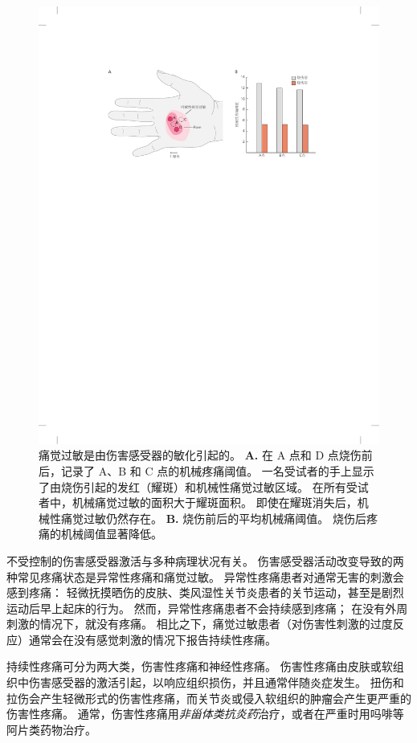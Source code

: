\begin{figure}[htbp]
	\centering
	\includegraphics[width=0.95\linewidth]{chap20/fig_20_7}
	\caption{痛觉过敏是由伤害感受器的敏化引起的\cite{raja1984evidence}。
		\textbf{A.} 在 A 点和 D 点烧伤前后，记录了 A、B 和 C 点的机械疼痛阈值。
		一名受试者的手上显示了由烧伤引起的发红（耀斑）和机械性痛觉过敏区域。
		在所有受试者中，机械痛觉过敏的面积大于耀斑面积。
		即使在耀斑消失后，机械性痛觉过敏仍然存在。
		\textbf{B.} 烧伤前后的平均机械痛阈值。
		烧伤后疼痛的机械阈值显著降低。}
	\label{fig:20_7}
\end{figure}


不受控制的伤害感受器激活与多种病理状况有关。
伤害感受器活动改变导致的两种常见疼痛状态是异常性疼痛和痛觉过敏。
异常性疼痛患者对通常无害的刺激会感到疼痛：
轻微抚摸晒伤的皮肤、类风湿性关节炎患者的关节运动，甚至是剧烈运动后早上起床的行为。
然而，异常性疼痛患者不会持续感到疼痛；
在没有外周刺激的情况下，就没有疼痛。
相比之下，痛觉过敏患者（对伤害性刺激的过度反应）通常会在没有感觉刺激的情况下报告持续性疼痛。


持续性疼痛可分为两大类，伤害性疼痛和神经性疼痛。
伤害性疼痛由皮肤或软组织中伤害感受器的激活引起，以响应组织损伤，并且通常伴随炎症发生。
扭伤和拉伤会产生轻微形式的伤害性疼痛，而关节炎或侵入软组织的肿瘤会产生更严重的伤害性疼痛。
通常，伤害性疼痛用\textit{非甾体类抗炎药}治疗，或者在严重时用吗啡等阿片类药物治疗。


